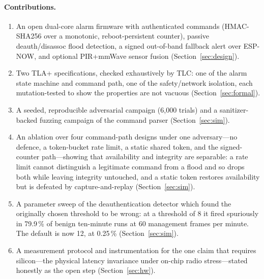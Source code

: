 \paragraph{Contributions.}
\begin{enumerate}\itemsep0.1em
\item An open dual-core alarm firmware with authenticated commands (HMAC-SHA256 over a
monotonic, reboot-persistent counter), passive deauth/disassoc flood detection, a signed
out-of-band fallback alert over ESP-NOW, and optional PIR+mmWave sensor fusion
(Section~\ref{sec:design}).
\item Two TLA+ specifications, checked exhaustively by TLC: one of the alarm state machine and
command path, one of the safety/network isolation, each mutation-tested to show the properties
are not vacuous (Section~\ref{sec:formal}).
\item A seeded, reproducible adversarial campaign (6{,}000 trials) and a sanitizer-backed fuzzing
campaign of the command parser (Section~\ref{sec:sim}).
\item An ablation over four command-path designs under one adversary---no defence, a
token-bucket rate limit, a static shared token, and the signed-counter path---showing that
availability and integrity are separable: a rate limit cannot distinguish a legitimate command
from a flood and so drops both while leaving integrity untouched, and a static token restores
availability but is defeated by capture-and-replay (Section~\ref{sec:sim}).
\item A parameter sweep of the deauthentication detector which found the originally chosen
threshold to be wrong: at a threshold of 8 it fired spuriously in 79.9\,\% of benign
ten-minute runs at 60 management frames per minute. The default is now 12, at 0.25\,\%
(Section~\ref{sec:sim}).
\item A measurement protocol and instrumentation for the one claim that requires silicon---the
physical latency invariance under on-chip radio stress---stated honestly as the open step
(Section~\ref{sec:hw}).
\end{enumerate}

